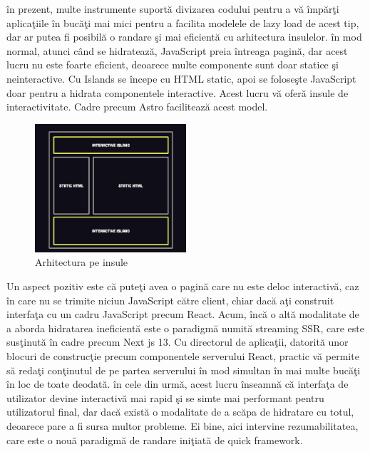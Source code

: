 \documentclass[12pt, a4paper]{report}
\begin{document}
\^ in prezent, multe instrumente suport\u a divizarea codului pentru a v\u a \^ imp\u ar\c ti aplica\c tiile \^ in buc\u a\c ti mai mici pentru a facilita modelele de lazy load de acest tip, dar ar putea fi posibil\u a o randare \c si mai eficient\u a cu arhitectura insulelor. \^ in mod normal, atunci c\^ and se hidrateaz\u a, JavaScript preia \^ intreaga pagin\u a, dar acest lucru nu este foarte eficient, deoarece multe componente sunt doar statice \c si neinteractive. Cu Islands se \^ incepe cu HTML static, apoi se folose\c ste JavaScript doar pentru a hidrata componentele interactive. Acest lucru v\u a ofer\u a insule de interactivitate. Cadre precum Astro faciliteaz\u a acest model.

\begin{figure}[htbp]
	\centering
	\includegraphics[width=0.5\textwidth]{43.png}
	\caption{Arhitectura pe insule}
	\label{fig:island architecture}
\end{figure}

Un aspect pozitiv este c\u a pute\c ti avea o pagin\u a care nu este deloc interactiv\u a, caz \^ in care nu se trimite niciun JavaScript c\u atre client, chiar dac\u a a\c ti construit interfa\c ta cu un cadru JavaScript precum React. Acum, \^ inc\u a o alt\u a modalitate de a aborda hidratarea ineficient\u a este o paradigm\u a numit\u a streaming SSR, care este sus\c tinut\u a \^ in cadre precum Next js 13. Cu directorul de aplica\c tii, datorit\u a unor blocuri de construc\c tie precum componentele serverului React, practic v\u a permite s\u a reda\c ti con\c tinutul de pe partea serverului \^ in mod simultan \^ in mai multe buc\u a\c ti \^ in loc de toate deodat\u a. \^ in cele din urm\u a, acest lucru \^ inseamn\u a c\u a interfa\c ta de utilizator devine interactiv\u a mai rapid \c si se simte mai performant pentru utilizatorul final, dar dac\u a exist\u a o modalitate de a sc\u apa de hidratare cu totul, deoarece pare a fi sursa multor probleme. Ei bine, aici intervine rezumabilitatea, care este o nou\u a paradigm\u a de randare ini\c tiat\u a de quick framework.
\end{document}
